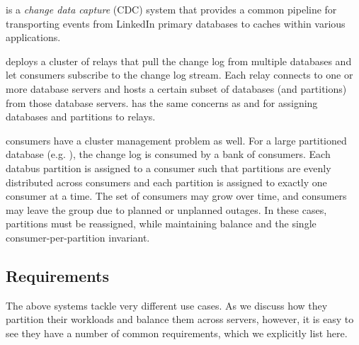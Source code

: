 \subheader{\databus}
\databus is a \emph{change data capture} (CDC) system that provides a common pipeline 
for transporting events from LinkedIn primary databases to caches within various applications. 

\databus deploys a cluster of relays that pull the change log from multiple databases and let consumers subscribe to the 
change log stream.  Each \databus relay connects to one or more database servers
and hosts a certain subset of databases (and partitions) from those database servers. 
\databus has the same concerns as \ES and \seas for assigning databases and
partitions to relays.

\databus consumers have a cluster management problem as well.  For a
large partitioned database (e.g. \ES), the change log is consumed by a bank of
consumers.  Each databus partition is assigned to a consumer such that
partitions are evenly distributed across consumers and each partition is
assigned to exactly one consumer at a time. The set of consumers may grow over
time, and consumers may leave the group due to planned or unplanned outages.  In 
these cases, partitions must be reassigned, while maintaining balance and the
single consumer-per-partition invariant. 

\subsection{Requirements}
\label{sec:requirements}
%
The above systems tackle very different use cases.  As we discuss how they
partition their workloads and balance them across servers, however, it is easy
to see they have a number of common requirements, which we explicitly list here.

